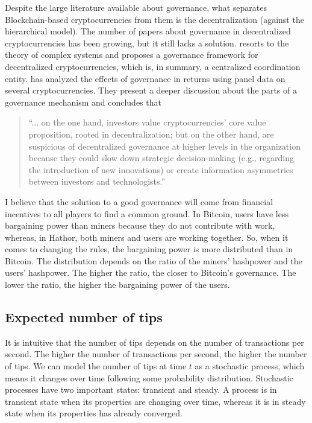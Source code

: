 Despite the large literature available about governance, what separates Blockchain-based cryptocurrencies from them is the decentralization (against the hierarchical model). The number of papers about governance in decentralized cryptocurrencies has been growing, but it still lacks a solution. \citet{hacker2017corporate} resorts to the theory of complex systems and proposes a governance framework for decentralized cryptocurrencies, which is, in summary, a centralized coordination entity. \citet{hsieh2017internal} has analyzed the effects of governance in returns using panel data on several cryptocurrencies. They present a deeper discussion about the parts of a governance mechanism and concludes that

\begin{quote}
``... on the one hand, investors value cryptocurrencies’ core value proposition, rooted in decentralization; but on the other hand, are suspicious of decentralized governance at higher levels in the organization because they could slow down strategic decision-making (e.g., regarding the introduction of new innovations) or create information asymmetries between investors and technologists.''
\end{quote}

I believe that the solution to a good governance will come from financial incentives to all players to find a common ground. In Bitcoin, users have less bargaining power than miners because they do not contribute with work, whereas, in Hathor, both miners and users are working together. So, when it comes to changing the rules, the bargaining power is more distributed than in Bitcoin. The distribution depends on the ratio of the miners' hashpower and the users' hashpower. The higher the ratio, the closer to Bitcoin's governance. The lower the ratio, the higher the bargaining power of the users.


\subsection{Expected number of tips}

It is intuitive that the number of tips depends on the number of transactions per second. The higher the number of transactions per second, the higher the number of tips. We can model the number of tips at time $t$ as a stochastic process, which means it changes over time following some probability distribution. Stochastic processes have two important states: transient and steady. A process is in transient state when its properties are changing over time, whereas it is in steady state when its properties has already converged.

